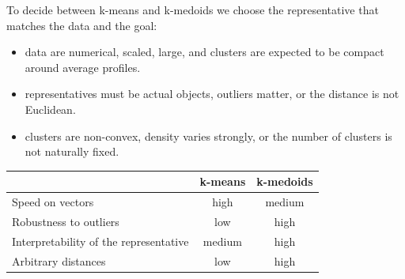 To decide between k-means and k-medoids we choose the representative that matches the data and the goal:
\begin{itemize}
  \item {} data are numerical, scaled, large, and clusters are expected to be compact around average profiles.
  \item {} representatives must be actual objects, outliers matter, or the distance is not Euclidean.
  \item {} clusters are non-convex, density varies strongly, or the number of clusters is not naturally fixed.
\end{itemize}

\begin{center}
\begin{tabular}{@{}lcc@{}}
\toprule
 & k-means & k-medoids \\
\midrule
Speed on vectors & high & medium \\
Robustness to outliers & low & high \\
Interpretability of the representative & medium & high \\
Arbitrary distances & low & high \\
\bottomrule
\end{tabular}
\end{center}

